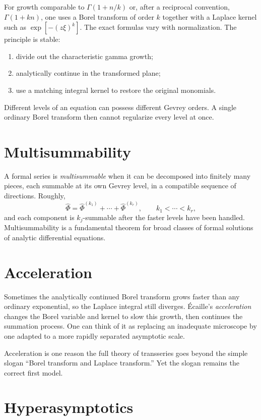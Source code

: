 \documentclass[11pt,oneside]{book}
\theoremstyle{definition}
\theoremstyle{remark}
\newcommand{\phihat}{\widehat{\Phi}}
\begin{document}
For growth comparable to $\Gamma(1+n/k)$ or, after a reciprocal convention,
$\Gamma(1+kn)$, one uses a Borel transform of order $k$ together with a Laplace
kernel such as $\exp[-(z\xi)^k]$. The exact formulas vary with normalization.
The principle is stable:
\begin{enumerate}
\item divide out the characteristic gamma growth;
\item analytically continue in the transformed plane;
\item use a matching integral kernel to restore the original monomials.
\end{enumerate}

Different levels of an equation can possess different Gevrey orders. A single
ordinary Borel transform then cannot regularize every level at once.

\section{Multisummability}

A formal series is \emph{multisummable} when it can be decomposed into finitely
many pieces, each summable at its own Gevrey level, in a compatible sequence of
directions. Roughly,
\[
  \phihat=\phihat^{(k_1)}+\cdots+\phihat^{(k_r)},
  \qquad k_1<\cdots<k_r,
\]
and each component is $k_j$-summable after the faster levels have been handled.
Multisummability is a fundamental theorem for broad classes of formal solutions
of analytic differential equations.

\section{Acceleration}

Sometimes the analytically continued Borel transform grows faster than any
ordinary exponential, so the Laplace integral still diverges. \'Ecaille's
\emph{acceleration} changes the Borel variable and kernel to slow this growth,
then continues the summation process. One can think of it as replacing an
inadequate microscope by one adapted to a more rapidly separated asymptotic
scale.

Acceleration is one reason the full theory of transseries goes beyond the
simple slogan ``Borel transform and Laplace transform.'' Yet the slogan remains
the correct first model.

\section{Hyperasymptotics}
\end{document}
